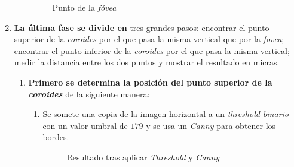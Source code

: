 \begin{enumerate}
\begin{enumerate}[label*=\arabic*.]
    \begin{figure}[H]
      \caption{Punto de la \emph{fóvea}}
      \centering \setlength\fboxsep{0pt} \setlength\fboxrule{0.5pt}
    \end{figure}

  \end{enumerate}
\item \textbf{La última fase se divide en} tres grandes pasos:
  encontrar el punto superior de la \emph{\gls{coroides}} por el que
  pasa la misma vertical que por la \emph{\gls{fovea}}; encontrar el
  punto inferior de la \emph{\gls{coroides}} por el que pasa la misma
  vertical; medir la distancia entre los dos puntos y mostrar el
  resultado en micras.
  \begin{enumerate}[label*=\arabic*.]
  \item \textbf{Primero se determina la posición del punto superior de
      la \emph{\gls{coroides}}} de la siguiente manera:
    \begin{enumerate}[label*=\arabic*.]
    \item Se somete una copia de la imagen horizontal a un
      \emph{threshold binario} con un valor umbral de $179$ y se usa
      un \emph{Canny} para obtener los bordes.

      \begin{figure}[H]
        \caption{Resultado tras aplicar \emph{Threshold} y
          \emph{Canny}}
        \centering \setlength\fboxsep{0pt} \setlength\fboxrule{0.5pt}
      \end{figure}


\end{enumerate}
\end{enumerate}
\end{enumerate}
